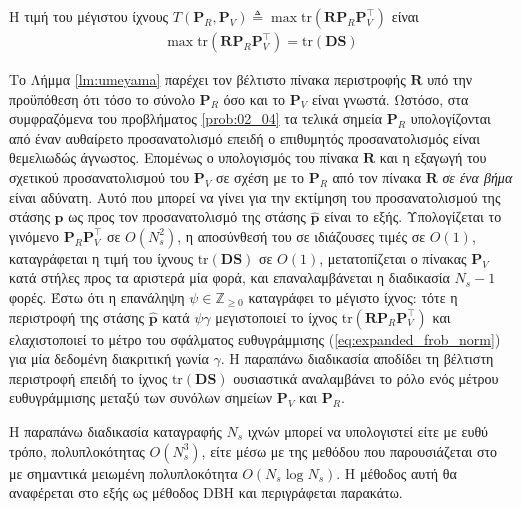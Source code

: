\begin{corollary}
  \label{corollary:umeyama}
  Η τιμή του μέγιστου ίχνους
  $T(\bm{P}_R, \bm{P}_V) \triangleq \max\text{tr}(\bm{R} \bm{P}_R \bm{P}_V^\top)$
  είναι
  \begin{align}
  \max\text{tr}(\bm{R} \bm{P}_R \bm{P}_V^\top) = \text{tr}(\bm{D}\bm{S})
  \end{align}
\end{corollary}

Το Λήμμα \ref{lm:umeyama} παρέχει τον βέλτιστο πίνακα περιστροφής $\bm{R}$ υπό
την προϋπόθεση ότι τόσο το σύνολο $\bm{P}_R$ όσο και το $\bm{P}_V$ είναι
γνωστά.  Ωστόσο, στα συμφραζόμενα του προβλήματος \ref{prob:02_04} τα τελικά
σημεία $\bm{P}_R$ υπολογίζονται από έναν αυθαίρετο προσανατολισμό επειδή ο
επιθυμητός προσανατολισμός είναι θεμελιωδώς άγνωστος. Επομένως ο υπολογισμός
του πίνακα $\bm{R}$ και η εξαγωγή  του σχετικού προσανατολισμού του $\bm{P}_V$
σε σχέση με το $\bm{P}_R$ από τον πίνακα $\bm{R}$ \textit{σε ένα βήμα} είναι
αδύνατη. Αυτό που μπορεί να γίνει για την εκτίμηση του προσανατολισμού της
στάσης $\bm{p}$ ως προς τον προσανατολισμό της στάσης $\hat{\bm{p}}$ είναι το
εξής. Υπολογίζεται το γινόμενο $\bm{P}_R \bm{P}_V^\top$ σε $O(N_s^2)$, η
αποσύνθεσή του σε ιδιάζουσες τιμές σε $O(1)$, καταγράφεται η τιμή του ίχνους
$\text{tr}(\bm{D}\bm{S})$ σε $O(1)$, μετατοπίζεται ο πίνακας $\bm{P}_V$ κατά
στήλες προς τα αριστερά μία φορά, και επαναλαμβάνεται η διαδικασία $N_s-1$
φορές. Έστω ότι η επανάληψη $\psi \in \mathbb{Z}_{\geq 0}$ καταγράφει το
μέγιστο ίχνος: τότε η περιστροφή της στάσης $\hat{\bm{p}}$ κατά $\psi \gamma$
μεγιστοποιεί το ίχνος $\text{tr}(\bm{R} \bm{P}_R \bm{P}_V^\top)$ και
ελαχιστοποιεί το μέτρο του σφάλματος ευθυγράμμισης
(\ref{eq:expanded_frob_norm}) για μία δεδομένη διακριτική γωνία $\gamma$. Η
παραπάνω διαδικασία αποδίδει τη βέλτιστη περιστροφή επειδή το ίχνος
$\text{tr}(\bm{D}\bm{S})$ ουσιαστικά αναλαμβάνει το ρόλο ενός μέτρου
ευθυγράμμισης μεταξύ των συνόλων σημείων $\bm{P}_V$ και $\bm{P}_R$.

Η παραπάνω διαδικασία καταγραφής $N_s$ ιχνών μπορεί να υπολογιστεί είτε με ευθύ
τρόπο, πολυπλοκότητας $O(N_s^3)$, είτε μέσω με της μεθόδου που παρουσιάζεται
στο \cite{Dogan2015} με σημαντικά μειωμένη πολυπλοκότητα $O(N_s \log N_s)$.  Η
μέθοδος αυτή θα αναφέρεται στο εξής ως μέθοδος DBH και περιγράφεται παρακάτω.


